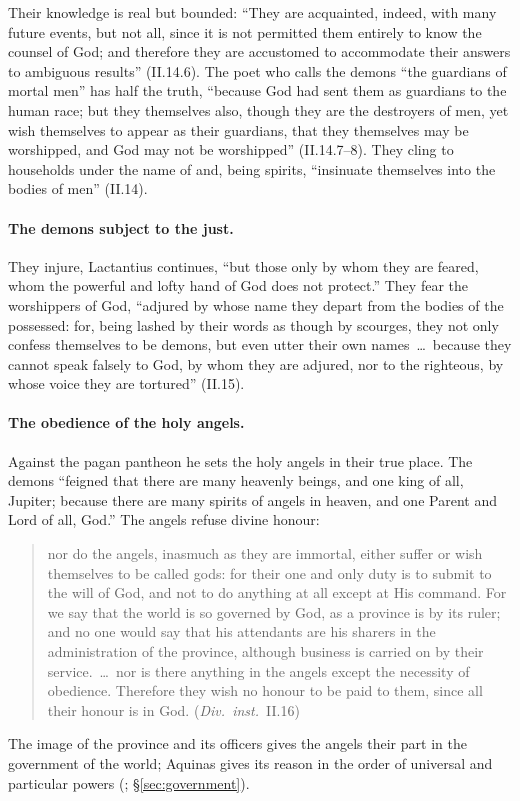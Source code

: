 Their knowledge is real but bounded: ``They are acquainted, indeed, with
many future events, but not all, since it is not permitted them entirely
to know the counsel of God; and therefore they are accustomed to
accommodate their answers to ambiguous results'' (II.14.6). The poet who calls the
demons ``the guardians of mortal men'' has half the truth, ``because God
had sent them as guardians to the human race; but they themselves also,
though they are the destroyers of men, yet wish themselves to appear as
their guardians, that they themselves may be worshipped, and God may not
be worshipped'' (II.14.7--8). They cling to households under the name of
 and, being spirits, ``insinuate themselves into the bodies
of men'' (II.14).

\paragraph{The demons subject to the just.} They injure, Lactantius
continues, ``but those only by whom they are feared, whom the powerful and
lofty hand of God does not protect.'' They fear the worshippers of God,
``adjured by whose name they depart from the bodies of the possessed: for,
being lashed by their words as though by scourges, they not only confess
themselves to be demons, but even utter their own names~\dots\ because
they cannot speak falsely to God, by whom they are adjured, nor to the
righteous, by whose voice they are tortured'' (II.15).

\paragraph{The obedience of the holy angels.} Against the pagan pantheon he
sets the holy angels in their true place. The demons ``feigned that there
are many heavenly beings, and one king of all, Jupiter; because there are
many spirits of angels in heaven, and one Parent and Lord of all, God.''
The angels refuse divine honour:
\begin{quote}
nor do the angels, inasmuch as they are immortal, either suffer or wish
themselves to be called gods: for their one and only duty is to submit to
the will of God, and not to do anything at all except at His command. For
we say that the world is so governed by God, as a province is by its
ruler; and no one would say that his attendants are his sharers in the
administration of the province, although business is carried on by their
service.~\dots\ nor is there anything in the angels except the necessity
of obedience. Therefore they wish no honour to be paid to them, since all
their honour is in God. (\emph{Div.\ inst.}\ II.16)
\end{quote}
\noindent The image of the province and its officers gives the angels
their part in the government of the world; Aquinas gives its reason in the order of universal and particular powers
(; \S\ref{sec:government}).

